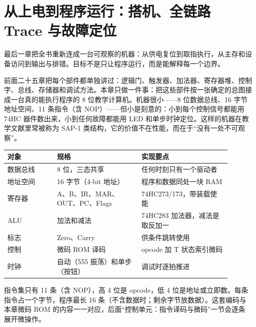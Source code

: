 \chapter{从上电到程序运行：搭机、全链路 Trace 与故障定位}

\begin{keyidea}
最后一章把全书重新连成一台可观察的机器：从供电复位到取指执行，从主存和设备访问到输出与排错。目标不是只让程序运行，而是能解释每一个边界。
\end{keyidea}

前面二十五章把每个部件都单独讲过：逻辑门、触发器、加法器、寄存器堆、控制字、总线、存储器和调试方法。本章只做一件事：把这些部件按一张确定的总图接成一台真的能执行程序的 8 位教学计算机。机器很小——8 位数据总线、16 字节地址空间、11 条指令（含 NOP）——但小是刻意的：小到每个控制信号都能用 74HC 器件数出来，小到任何故障都能用 LED 和单步时钟定位。这样的机器在教学文献里常被称为 SAP-1 类结构，它的价值不在性能，而在于“没有一处不可观察”。

\begin{longtable}{L{0.2\linewidth}L{0.34\linewidth}L{0.36\linewidth}}
\toprule
对象 & 规格 & 实现要点 \\
\midrule
数据总线 & 8 位，三态共享 & 任何时刻只有一个驱动者 \\\tablerowrule
地址空间 & 16 字节（4-bit 地址） & 程序和数据同处一块 RAM \\\tablerowrule
寄存器 & A、B、IR、MAR、OUT、PC、Flags & 74HC273/173，带装载使能 \\\tablerowrule
ALU & 加法和减法 & 74HC283 加法器，减法是取反加一 \\\tablerowrule
标志 & Zero、Carry & 供条件跳转使用 \\\tablerowrule
控制 & 微码 ROM 译码 & opcode 加 T 状态索引微码 \\\tablerowrule
时钟 & 自动（555 振荡）和单步（按钮） & 调试时逐拍推进 \\
\bottomrule
\end{longtable}

指令集只有 11 条（含 NOP），高 4 位是 opcode，低 4 位是地址或立即数。每条指令占一个字节，程序最长 16 条（不含数据时；剩余字节放数据）。这套编码与本章微码 ROM 的内容一一对应，后面“控制单元：指令译码与微码”一节会逐条展开微操作。

